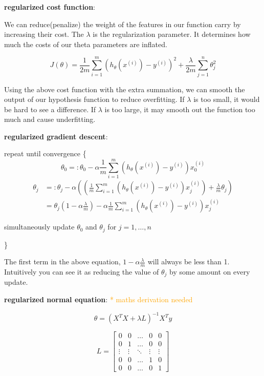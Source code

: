 \documentclass{article}
\begin{document}
\textbf{regularized cost function}:

We can reduce(penalize) the weight of the features in our function carry by increasing their cost. The \(\lambda\) is the regularization parameter. It determines how much the costs of our theta parameters are inflated. 

\[J(\theta) = \frac{1}{2m} \sum_{i = 1}^m (h_{\theta}(x^{(i)}) - y^{(i)})^2 + \frac{\lambda}{2m} \sum_{j = 1}^n \theta_j^2\]

Using the above cost function with the extra summation, we can smooth the output of our hypothesis function to reduce overfitting. If \(\lambda\) is too small, it would be hard to see a difference. If \(\lambda\) is too large, it may smooth out the function too much and cause underfitting.

\textbf{regularized gradient descent}:

repeat until convergence \{
\[\theta_0 =: \theta_0 - \alpha \frac{1}{m} \sum_{i = 1}^m (h_{\theta}(x^{(i)}) - y^{(i)}) x^{(i)}_0\]
\begin{equation*}
\begin{split}
\theta_j & =: \theta_j - \alpha ((\frac{1}{m} \sum_{i = 1}^m (h_{\theta}(x^{(i)}) - y^{(i)}) x^{(i)}_j) + \frac{\lambda}{m} \theta_j) \\
 & = \theta_j (1 - \alpha \frac{\lambda}{m}) - \alpha \frac{1}{m} \sum_{i = 1}^m (h_{\theta}(x^{(i)}) - y^{(i)}) x^{(i)}_j
\end{split}
\end{equation*}

\centerline{simultaneously update \(\theta_0\) and \(\theta_j\) for \(j = 1, \dots, n\)}
\}

The first term in the above equation, \(1 - \alpha \frac{\lambda}{m}\) will always be less than 1. Intuitively you can see it as reducing the value of \(\theta_j\) by some amount on every update.

\textbf{regularized normal equation}: \textcolor{orange}{ * maths derivation needed}

\[
\theta = (X^TX + \lambda L)^{-1}X^Ty
\]

\[
L = 
\begin{bmatrix}
0 & 0 & \dots & 0 & 0\\
0 & 1 & \dots & 0 & 0\\
\vdots & \vdots & \ddots & \vdots & \vdots\\
0 & 0 & \dots & 1 & 0\\
0 & 0 & \dots & 0 & 1
\end{bmatrix}
\]
\end{document}
